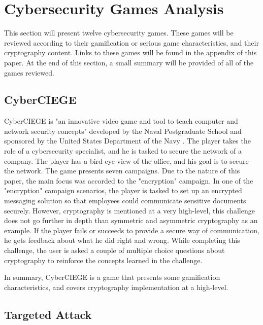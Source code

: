 \documentclass{l4proj}
\begin{document}
\section{Cybersecurity Games Analysis}

This section will present twelve cybersecurity games. These games will be reviewed according to their gamification or serious game characteristics,
and their cryptography content. Links to these games will be found in the appendix of this paper. 
At the end of this section, a small summary will be provided of all of the games reviewed.

\subsection{CyberCIEGE}

CyberCIEGE is "an innovative video game and tool to teach computer and network security concepts" developed by the Naval Postgraduate School and 
sponsored by the United States Department of the Navy \citep{noauthor_cyberciege_nodate}. The player takes the role of a cybersecurity specialist, 
and he is tasked to secure the network of a company. The player has a bird-eye view of the office, and his goal is to secure the network.
The game presents seven campaigns. Due to the nature of this paper, the main focus was accorded to the "encryption" campaign.
In one of the "encryption" campaign scenarios, the player is tasked to set up an encrypted messaging solution so that employees could communicate sensitive documents securely.
However, cryptography is mentioned at a very high-level, this challenge does not go further in depth than symmetric and asymmetric cryptography as an example.
If the player fails or succeeds to provide a secure way of communication, he gets feedback about what he did right and wrong.
While completing this challenge, the user is asked a couple of multiple choice questions about cryptography to reinforce the concepts learned in the challenge.

In summary, CyberCIEGE is a game that presents some gamification characteristics, and covers cryptography implementation at a high-level.

\subsection{Targeted Attack}
\end{document}
